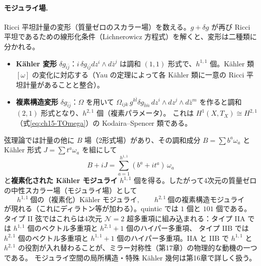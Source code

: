 \paragraph{モジュライ場.}
Ricci 平坦計量の変形（質量ゼロのスカラー場）を数える。$g + \delta g$ が再び Ricci 平坦であるための線形化条件（Lichnerowicz 方程式）を解くと、変形は二種類に分かれる。
\begin{itemize}
\item \textbf{K\"ahler 変形} $\delta g_{i\bar j}$：$i\,\delta g_{i\bar j}dz^i\wedge d\bar z^j$ は調和 $(1,1)$ 形式で、$h^{1,1}$ 個。K\"ahler 類 $[\omega]$ の変化に対応する（Yau の定理によって各 K\"ahler 類に一意の Ricci 平坦計量があることと整合）。
\item \textbf{複素構造変形} $\delta g_{\bar i\bar j}$：$\Omega$ を用いて $\Omega_{ijk}\,g^{k\bar l}\delta g_{\bar l\bar m}\,dz^i\wedge dz^j\wedge d\bar z^m$ を作ると調和 $(2,1)$ 形式となり、$h^{2,1}$ 個（複素パラメータ）。
これは $H^1(X,T_X)\cong H^{2,1}$（式\eqref{eq:ch15-TOmega}）の Kodaira--Spencer 類である。
\end{itemize}
弦理論では計量の他に $B$ 場（2形式場）があり、その調和成分 $B = \sum b^a\omega_a$ と K\"ahler 形式 $J = \sum t^a\omega_a$ を組にして
\[
B + iJ = \sum_{a=1}^{h^{1,1}}(b^a+it^a)\,\omega_a
\]
と\textbf{複素化された K\"ahler モジュライ} $h^{1,1}$ 個を得る。したがって4次元の質量ゼロの中性スカラー場（モジュライ場）として
\[
h^{1,1}\ \text{個の（複素化）K\"ahler モジュライ},\qquad h^{2,1}\ \text{個の複素構造モジュライ}
\]
が現れる（これにディラトン等が加わる）。quintic では $1$ 個と $101$ 個である。
タイプ II 弦ではこれらは4次元 $\mathcal N=2$ 超多重項に組み込まれる：タイプ IIA では $h^{1,1}$ 個のベクトル多重項と $h^{2,1}+1$ 個のハイパー多重項、
タイプ IIB では $h^{2,1}$ 個のベクトル多重項と $h^{1,1}+1$ 個のハイパー多重項。IIA と IIB で $h^{1,1}$ と $h^{2,1}$ の役割が入れ替わることが、ミラー対称性（第17章）の物理的な動機の一つである。
モジュライ空間の局所構造・特殊 K\"ahler 幾何は第16章で詳しく扱う。

